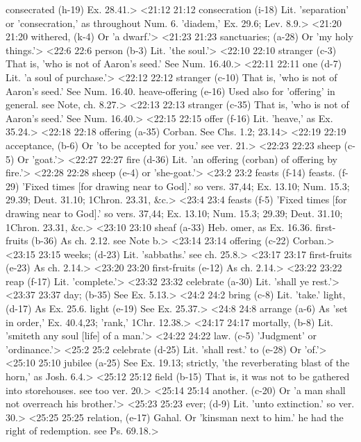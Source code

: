   consecrated (h-19)  Ex. 28.41.>
<21:12 21:12  consecration (i-18)  Lit. 'separation' or 'consecration,' as throughout Num. 6.  'diadem,' Ex. 29.6; Lev. 8.9.>
<21:20 21:20  withered, (k-4)  Or 'a dwarf.'>
<21:23 21:23  sanctuaries; (a-28)  Or 'my holy things.'>
<22:6 22:6  person (b-3)  Lit. 'the soul.'>
<22:10 22:10  stranger (c-3) That is, 'who is not of Aaron's seed.' See Num. 16.40.>
<22:11 22:11  one (d-7)  Lit. 'a soul of purchase.'>
<22:12 22:12  stranger (c-10) That is, 'who is not of Aaron's seed.' See Num. 16.40.
  heave-offering (e-16)  Used also for 'offering' in general. see Note, ch. 8.27.>
<22:13 22:13  stranger (c-35)  That is, 'who is not of Aaron's seed.' See Num. 16.40.>
<22:15 22:15  offer (f-16)  Lit. 'heave,' as Ex. 35.24.>
<22:18 22:18  offering (a-35)  Corban. See Chs. 1.2; 23.14>
<22:19 22:19  acceptance, (b-6)  Or 'to be accepted for you.' see ver. 21.>
<22:23 22:23  sheep (c-5)  Or 'goat.'>
<22:27 22:27  fire (d-36)  Lit. 'an offering (corban) of offering by fire.'>
<22:28 22:28  sheep (e-4)  or 'she-goat.'>
<23:2 23:2  feasts (f-14)  feasts. (f-29)
  'Fixed times [for drawing near to God].' so vers. 37,44; Ex. 13.10; Num. 15.3; 29.39; Deut. 31.10; 1Chron. 23.31, &c.>
<23:4 23:4  feasts (f-5)  'Fixed times [for drawing near to God].' so vers. 37,44; Ex.  13.10; Num. 15.3; 29.39; Deut. 31.10; 1Chron. 23.31, &c.>
<23:10 23:10  sheaf (a-33)  Heb. omer, as Ex. 16.36.  first-fruits (b-36)  As ch. 2.12. see Note b.>
<23:14 23:14  offering (c-22)  Corban.>
<23:15 23:15  weeks; (d-23)  Lit. 'sabbaths.' see ch. 25.8.>
<23:17 23:17  first-fruits (e-23)  As ch. 2.14.>
<23:20 23:20  first-fruits (e-12)  As ch. 2.14.>
<23:22 23:22  reap (f-17)  Lit. 'complete.'>
<23:32 23:32  celebrate (a-30)  Lit. 'shall ye rest.'>
<23:37 23:37  day; (b-35)  See Ex. 5.13.>
<24:2 24:2  bring (c-8)  Lit. 'take.'
  light, (d-17)  As Ex. 25.6.
  light (e-19)  See Ex. 25.37.>
<24:8 24:8  arrange (a-6)  As 'set in order,' Ex. 40.4,23; 'rank,' 1Chr. 12.38.>
<24:17 24:17  mortally, (b-8)  Lit. 'smiteth any soul [life] of a man.'>
<24:22 24:22  law. (c-5)  'Judgment' or 'ordinance.'>
<25:2 25:2  celebrate (d-25)  Lit. 'shall rest.'
  to (e-28)  Or 'of.'>
<25:10 25:10  jubilee (a-25)  See Ex. 19.13; strictly, 'the reverberating blast of the  horn,' as Josh. 6.4.>
<25:12 25:12  field (b-15)  That is, it was not to be gathered into storehouses. see too  ver. 20.>
<25:14 25:14  another. (c-20)  Or 'a man shall not overreach his brother.'>
<25:23 25:23  ever; (d-9)  Lit. 'unto extinction.' so ver. 30.>
<25:25 25:25  relation, (e-17)  Gahal. Or 'kinsman next to him.' he had the right of  redemption. see Ps. 69.18.>
